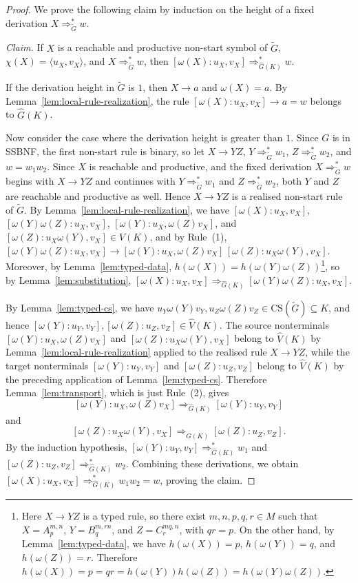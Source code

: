\documentclass[11pt,a4paper]{article}
\newcommand{\CS}{\mathrm{CS}}
\begin{document}
\begin{proof}
We prove the following claim by induction on the height of a fixed derivation $X\Rightarrow_{\widetilde G}^* w$.

\smallskip\noindent\emph{Claim.} If $X$ is a reachable and productive non-start symbol of $\widetilde G$, $\chi(X)=\langle u_X,v_X\rangle$, and $X\Rightarrow_{\widetilde G}^* w$, then $[\omega(X):u_X,v_X]\Rightarrow_{\hat G(K)}^* w$.

\smallskip If the derivation height in $\widetilde G$ is $1$, then $X\to a$ and $\omega(X)=a$. By Lemma~\ref{lem:local-rule-realization}, the rule $[\omega(X):u_X,v_X]\to a=w$ belongs to $\hat G(K)$.

Now consider the case where the derivation height is greater than $1$. Since $G$ is in SSBNF, the first non-start rule is binary, so let $X\to YZ$, $Y\Rightarrow_{\widetilde G}^* w_1$, $Z\Rightarrow_{\widetilde G}^* w_2$, and $w=w_1w_2$. Since $X$ is reachable and productive, and the fixed derivation
$X\Rightarrow_{\widetilde G}^* w$ begins with $X\to YZ$ and continues with
$Y\Rightarrow_{\widetilde G}^* w_1$ and $Z\Rightarrow_{\widetilde G}^* w_2$,
both $Y$ and $Z$ are reachable and productive as well. Hence
$X\to YZ$ is a realised non-start rule of $\widetilde G$. By Lemma~\ref{lem:local-rule-realization}, we have
$[\omega(X):u_X,v_X]$,
$[\omega(Y)\omega(Z):u_X,v_X]$,
$[\omega(Y):u_X,\omega(Z)v_X]$,
and
$[\omega(Z):u_X\omega(Y),v_X]\in\hat V(K)$,
and by Rule~\textup{(1)},
$[\omega(Y)\omega(Z):u_X,v_X]\to[\omega(Y):u_X,\omega(Z)v_X]\,[\omega(Z):u_X\omega(Y),v_X]$.
Moreover, by Lemma~\ref{lem:typed-data}, $h(\omega(X))=h(\omega(Y)\omega(Z))$\footnote{Here $X\to YZ$ is a typed rule, so there exist $m,n,p,q,r\in M$ such that
$X=A_p^{m,n}$, $Y=B_q^{m,rn}$, and $Z=C_r^{mq,n}$,
with $qr=p$.
On the other hand, by Lemma~\ref{lem:typed-data}, we have $h(\omega(X))=p$, $h(\omega(Y))=q$, and $h(\omega(Z))=r$.
Therefore
$h(\omega(X))=p=qr=h(\omega(Y))h(\omega(Z))=h(\omega(Y)\omega(Z))$.},
so by Lemma~\ref{lem:substitution},
$[\omega(X):u_X,v_X]\Rightarrow_{\hat G(K)}[\omega(Y)\omega(Z):u_X,v_X]$.

By Lemma~\ref{lem:typed-cs}, we have
$u_Y\omega(Y)v_Y,u_Z\omega(Z)v_Z\in\CS(\widetilde G)\subseteq K$,
and hence
$[\omega(Y):u_Y,v_Y],[\omega(Z):u_Z,v_Z]\in\hat V(K)$.
The source nonterminals
$[\omega(Y):u_X,\omega(Z)v_X]$ and
$[\omega(Z):u_X\omega(Y),v_X]$ belong to $\hat V(K)$ by
Lemma~\ref{lem:local-rule-realization} applied to the realised rule
$X\to YZ$, while the target nonterminals
$[\omega(Y):u_Y,v_Y]$ and $[\omega(Z):u_Z,v_Z]$ belong to
$\hat V(K)$ by the preceding application of Lemma~\ref{lem:typed-cs}.
Therefore Lemma~\ref{lem:transport}, which is just Rule~\textup{(2)}, gives
\[
[\omega(Y):u_X,\omega(Z)v_X]
\Rightarrow_{\hat G(K)}
[\omega(Y):u_Y,v_Y]
\]
and
\[
[\omega(Z):u_X\omega(Y),v_X]
\Rightarrow_{\hat G(K)}
[\omega(Z):u_Z,v_Z].
\]
By the induction hypothesis,
$[\omega(Y):u_Y,v_Y]\Rightarrow_{\hat G(K)}^* w_1$
and
$[\omega(Z):u_Z,v_Z]\Rightarrow_{\hat G(K)}^* w_2$.
Combining these derivations, we obtain
$[\omega(X):u_X,v_X]\Rightarrow_{\hat G(K)}^* w_1w_2=w$,
proving the claim.


\end{proof}
\end{document}
